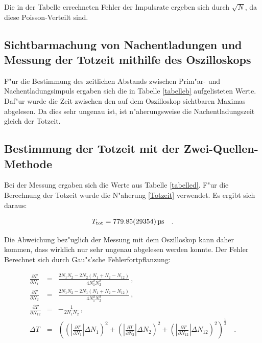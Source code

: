 	Die in der Tabelle errechneten Fehler der Impulsrate ergeben sich durch $\sqrt{N}$, da diese Poisson-Verteilt sind.

	\subsection{Sichtbarmachung von Nachentladungen und Messung der Totzeit mithilfe des Oszilloskops} %
	 \label{sub:sichtbarmachung_von_nachentladungen}

	
	
	F"ur die Bestimmung des zeitlichen Abstands zwischen Prim"ar- und Nachentladungsimpuls ergaben sich die in Tabelle \ref{tabelleb} aufgelisteten Werte. Daf"ur wurde die Zeit zwischen den auf dem Oszilloskop sichtbaren Maximas abgelesen.
	Da dies sehr ungenau ist, ist n"aherungsweise die Nachentladungszeit gleich der Totzeit.

	\subsection{Bestimmung der Totzeit mit der Zwei-Quellen-Methode} %
	\label{sub:bestimmung_der_totzeit_mit_der_zwei_quellen_methode}
	
	

	Bei der Messung ergaben sich die Werte aus Tabelle \ref{tabelled}.
	F"ur die Berechnung der Totzeit wurde die N"aherung \eqref{Totzeit} verwendet.
	Es ergibt sich daraus:

	\begin{equation*}
		T_\mathrm{tot} = \SI{779.85 (29354)}{\micro\second} \quad .
	\end{equation*}

	Die Abweichung bez"uglich der Messung mit dem Oszilloskop kann daher kommen, dass wirklich nur sehr ungenau abgelesen werden konnte.
	Der Fehler Berechnet sich durch Gau"s'sche Fehlerfortpflanzung:

	\begin{eqnarray*}
		\frac{\partial T}{\partial N_\mathrm{1}} &=& \frac{2 N_\mathrm{1}N_\mathrm{2} - 2 N_\mathrm{2}(N_\mathrm{1} + N_\mathrm{2} - N_\mathrm{12})}{4N_\mathrm{1}^2N_\mathrm{2}^2} \, , \\
		\frac{\partial T}{\partial N_\mathrm{2}} &=& \frac{2 N_\mathrm{1}N_\mathrm{2} - 2 N_\mathrm{1}(N_\mathrm{1} + N_\mathrm{2} - N_\mathrm{12})}{4N_\mathrm{1}^2N_\mathrm{2}^2} \, ,\\
		\frac{\partial T}{\partial N_\mathrm{12}} &=& -\frac{1}{2 N_\mathrm{1} N_\mathrm{2}} \, ,\\
		\Delta T &=& \left( \left( |\frac{\partial T}{\partial N_\mathrm{1}}| \Delta N_\mathrm{1} \right)^2 + \left( |\frac{\partial T}{\partial N_\mathrm{2}}| \Delta N_\mathrm{2} \right)^2 + \left( |\frac{\partial T}{\partial N_\mathrm{12}}| \Delta N_\mathrm{12} \right)^2 \right)^\frac{1}{2} \quad .
	\end{eqnarray*}